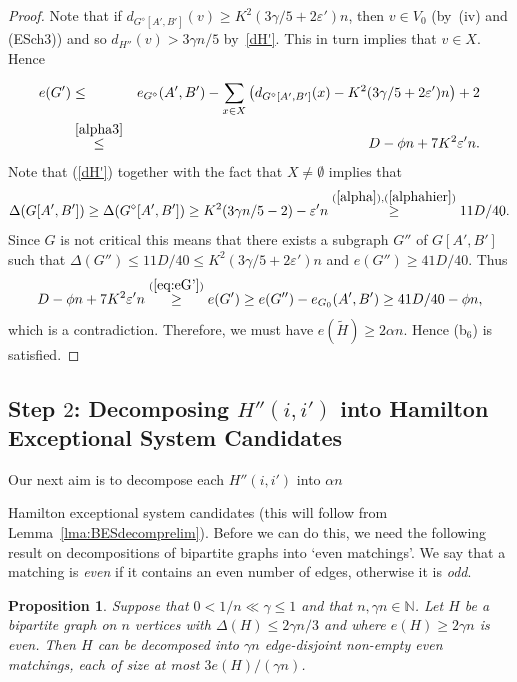 \documentclass{memo-l}
\newtheorem{prop}[firstthm]{Proposition}
\def\COMMENT#1{}
\def\eps{\varepsilon}
\numberwithin{section}{chapter}
\numberwithin{equation}{section}
\numberwithin{firstthm}{section}
\numberwithin{figure}{section}
\begin{document}
{\begin{proof}
Note that if $d_{G^{\diamond}[A',B']}(v) \ge  K^2(3 \gamma / 5 +2 \eps' ) n $, then $v\in V_0$ (by~(iv) and (ESch3)) and so
$d_{H''}(v) > 3 \gamma n/ 5$ by~\eqref{dH'}. This in turn implies that $v \in X$.
Hence%
   \COMMENT{The +2 in the next inequality accounts for the edges in $G^{\diamond}[A'\cap X,B'\cap X]$.}
\begin{eqnarray}
	e(G') & \le & e_{G^{\diamond}}(A',B') -  \sum_{x \in X } \left( d_{G^{\diamond}[A',B']}(x) -  K^2( 3\gamma /5+ 2\eps' )n  \right)+2 \nonumber\\
	& \overset{\eqref{alpha3}}{\le} & D- \phi n + 7K^2\eps' n.\label{eq:eG'}
\end{eqnarray}
Note that (\ref{dH'}) together with the fact that $X\neq \emptyset$ implies that
$$\Delta(G[A',B'])\ge \Delta (G^\diamond[A',B'])\ge K^2(3 \gamma n/ 5 -2) -\eps' n\stackrel{(\ref{alpha}), (\ref{alphahier})}{\ge} 11D/40.$$
Since $G$ is not critical this means that
there exists a subgraph $G''$ of $G[A',B']$ such that $\Delta(G'') \le 11 D /40 \le   K^2( 3\gamma /5+ 2 \eps' )n  $ and $e(G'') \ge 41 D/40$.
Thus
\begin{align*}
	D - \phi n + 7K^2 \eps' n \stackrel{(\ref{eq:eG'})}{\ge} e(G') \ge e(G'') - e_{G_0}(A',B') \ge 41 D/40 - \phi n,
\end{align*}
which is a contradiction.
Therefore, we must have $e(\widetilde{H}) \ge 2 \alpha n$.
Hence (b$_6$) is satisfied.
\end{proof}


\subsection{Step $2$: Decomposing $H''(i,i')$ into Hamilton Exceptional System Candidates}

Our next aim is to decompose each $H''(i,i')$ into $\alpha n$%
	\COMMENT{$\alpha n = \frac{D- \phi n }{2K^2}$ as defined in Lemma~\ref{lma:move}.}
 Hamilton exceptional system candidates (this will follow from Lemma~\ref{lma:BESdecomprelim}).
Before we can do this, we need the following result on decompositions of bipartite graphs into `even matchings'.
We say that a matching is \emph{even} if it contains an even number of edges, otherwise it is \emph{odd}.

\begin{prop}\label{prop:evenmatching}
Suppose that $0<1/n \ll \gamma \le 1$ and that $n, \gamma n \in \mathbb N$.
Let $H$ be a bipartite graph on $n$ vertices with $\Delta(H) \le 2\gamma n/3$ and where $ e(H) \geq 2 \gamma n$ is even.
Then $H$ can be decomposed into $\gamma n$ edge-disjoint non-empty even matchings, each of size at most $3e(H)/(\gamma n)$.
\end{prop}

}
\end{document}
